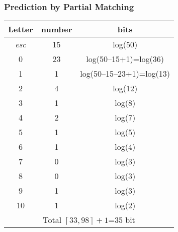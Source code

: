 \documentclass[14pt]{beamer}
\begin{document}
\begin{frame}
\frametitle{Prediction by Partial Matching}

    \begin{table}[htbp]
    \begin{center}
    \scalebox{0.85} {
    \begin{tabular}
    {|c|c|c|} \hline %
    Letter& number & bits \\ \hline %
    \textit{esc}& 15& log(50) \\ \hline %
    0& 23& log(50--15+1)=log(36) \\ \hline %
    1& 1& log(50--15--23+1)=log(13) \\ \hline %
    2& 4& log(12) \\ \hline %
    3& 1& log(8) \\ \hline %
    4& 2& log(7) \\ \hline %
    5& 1& log(5) \\ \hline %
    6& 1& log(4) \\ \hline %
    7& 0& log(3) \\ \hline %
    8& 0& log(3) \\ \hline %
    9& 1& log(3) \\ \hline %
    10& 1& log(2) \\ \hline %
    \multicolumn{3}{|c|}{Total $\left\lceil {33,98} \right\rceil + 1$=35 bit }  \\
    \hline %
    \end{tabular}
    }
    \label{tab4_8}
    \end{center}
    \end{table}

\end{frame}
\end{document}
